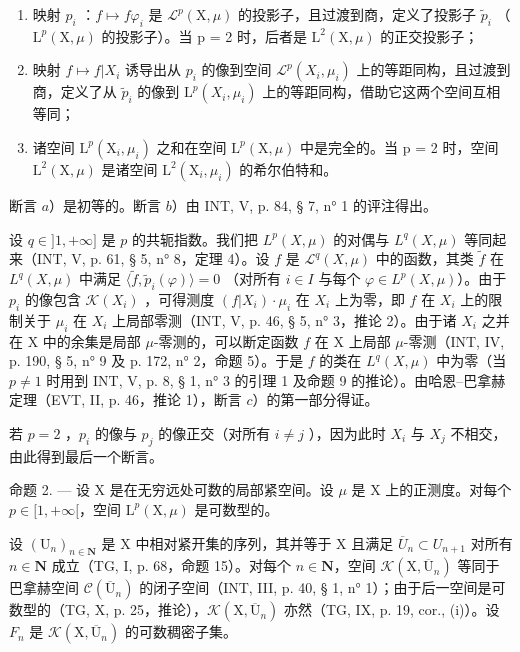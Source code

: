 \begin{enumerate}
\def\labelenumi{\alph{enumi})}
\item
  映射 \(p_{i}\) ：\(f \mapsto f\varphi_{i}\) 是 \(\mathcal{L}^{p}(\mathrm{X}, \mu)\) 的投影子，且过渡到商，定义了投影子 \(\widetilde{p}_{i}\) （\(\mathrm{L}^{p}(\mathrm{X}, \mu)\) 的投影子）。当 p = 2 时，后者是 \(\mathrm{L}^{2}(\mathrm{X}, \mu)\) 的正交投影子；
\item
  映射 \(f \mapsto f|X_i\) 诱导出从 \(p_i\) 的像到空间 \(\mathcal{L}^p(X_i, \mu_i)\) 上的等距同构，且过渡到商，定义了从 \(\widetilde{p}_i\) 的像到 \(\mathrm{L}^p(X_i, \mu_i)\) 上的等距同构，借助它这两个空间互相等同；
\item
  诸空间 \(\mathrm{L}^{p}(\mathrm{X}_{i},\mu_{i})\) 之和在空间 \(\mathrm{L}^{p}(\mathrm{X},\mu)\) 中是完全的。当 p = 2 时，空间 \(\mathrm{L}^{2}(\mathrm{X},\mu)\) 是诸空间 \(\mathrm{L}^{2}(\mathrm{X}_{i},\mu_{i})\) 的希尔伯特和。
\end{enumerate}

断言 \(a\)）是初等的。断言 \(b\)）由 INT, V, p. 84, § 7, n° 1 的评注得出。

设 \(q \in ]1, +\infty]\) 是 \(p\) 的共轭指数。我们把 \(L^p(X, \mu)\) 的对偶与 \(L^q(X, \mu)\) 等同起来（INT, V, p. 61, § 5, n° 8，定理 4）。设 \(f\) 是 \(\mathcal{L}^q(X, \mu)\) 中的函数，其类 \(\widetilde{f}\) 在 \(L^q(X, \mu)\) 中满足 \(\langle \widetilde{f}, \widetilde{p}_i(\varphi) \rangle = 0\) （对所有 \(i \in I\) 与每个 \(\varphi \in L^p(X, \mu)\)）。由于 \(p_i\) 的像包含 \(\mathcal{K}(X_i)\) ，可得测度 \((f|X_i) \cdot \mu_i\) 在 \(X_i\) 上为零，即 \(f\) 在 \(X_i\) 上的限制关于 \(\mu_i\) 在 \(X_i\) 上局部零测（INT, V, p. 46, § 5, n° 3，推论 2）。由于诸 \(X_i\) 之并在 X 中的余集是局部 \(\mu\)-零测的，可以断定函数 \(f\) 在 X 上局部 \(\mu\)-零测（INT, IV, p. 190, § 5, n° 9 及 p. 172, n° 2，命题 5）。于是 \(f\) 的类在 \(L^q(X, \mu)\) 中为零（当 \(p \neq 1\) 时用到 INT, V, p. 8, § 1, n° 3 的引理 1 及命题 9 的推论）。由哈恩--巴拿赫定理（EVT, II, p. 46，推论 1），断言 \(c\)）的第一部分得证。

若 \(p = 2\) ，\(p_i\) 的像与 \(p_j\) 的像正交（对所有 \(i \neq j\) ），因为此时 \(X_i\) 与 \(X_j\) 不相交，由此得到最后一个断言。

命题 2. --- 设 X 是在无穷远处可数的局部紧空间。设 \(\mu\) 是 X 上的正测度。对每个 \(p \in [1, +\infty[\)，空间 \(\mathrm{L}^{p}(\mathrm{X},\mu)\) 是可数型的。

设 \((\mathrm{U}_{n})_{n\in\mathbf{N}}\) 是 X 中相对紧开集的序列，其并等于 X 且满足 \(\overline{U}_{n}\subset U_{n+1}\) 对所有 \(n\in\mathbf{N}\) 成立（TG, I, p. 68，命题 15）。对每个 \(n\in\mathbf{N}\)，空间 \(\mathcal{K}(\mathrm{X},\overline{\mathrm{U}}_{n})\) 等同于巴拿赫空间 \(\mathcal{C}(\overline{\mathrm{U}}_{n})\) 的闭子空间（INT, III, p. 40, § 1, n° 1）；由于后一空间是可数型的（TG, X, p. 25，推论），\(\mathcal{K}(\mathrm{X},\overline{\mathrm{U}}_{n})\) 亦然（TG, IX, p. 19, cor., (i)）。设 \(F_{n}\) 是 \(\mathcal{K}(\mathrm{X},\overline{\mathrm{U}}_{n})\) 的可数稠密子集。

